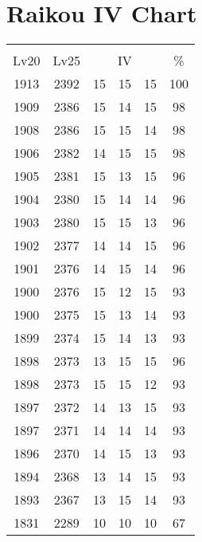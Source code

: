 \documentclass{article}%
\begin{document}
%
\normalsize%
\section{Raikou IV Chart}%
\label{sec:Raikou IV Chart}%
\renewcommand{\arraystretch}{1.5}%
\begin{tabular}{|c|c|c|c|c|c|}%
\hline%
\multicolumn{6}{|c|}{\textcolor{white}{ 
\linebreak{Raikou}
}%
\cellcolor{black}}\\%
\multicolumn{1}{|c}{Lv20}&\multicolumn{1}{c|}{Lv25}&\multicolumn{3}{c|}{IV}&\multicolumn{1}{|c|}{\%}\\%
\hline%
\rowcolor{color100}%
1913&2392&15&15&15&100\\%
\hline%
\rowcolor{color98}%
1909&2386&15&14&15&98\\%
\hline%
\rowcolor{color98}%
1908&2386&15&15&14&98\\%
\hline%
\rowcolor{color98}%
1906&2382&14&15&15&98\\%
\hline%
\rowcolor{color96}%
1905&2381&15&13&15&96\\%
\hline%
\rowcolor{color96}%
1904&2380&15&14&14&96\\%
\hline%
\rowcolor{color96}%
1903&2380&15&15&13&96\\%
\hline%
\rowcolor{color96}%
1902&2377&14&14&15&96\\%
\hline%
\rowcolor{color96}%
1901&2376&14&15&14&96\\%
\hline%
\rowcolor{color93}%
1900&2376&15&12&15&93\\%
\hline%
\rowcolor{color93}%
1900&2375&15&13&14&93\\%
\hline%
\rowcolor{color93}%
1899&2374&15&14&13&93\\%
\hline%
\rowcolor{color96}%
1898&2373&13&15&15&96\\%
\hline%
\rowcolor{color93}%
1898&2373&15&15&12&93\\%
\hline%
\rowcolor{color93}%
1897&2372&14&13&15&93\\%
\hline%
\rowcolor{color93}%
1897&2371&14&14&14&93\\%
\hline%
\rowcolor{color93}%
1896&2370&14&15&13&93\\%
\hline%
\rowcolor{color93}%
1894&2368&13&14&15&93\\%
\hline%
\rowcolor{color93}%
1893&2367&13&15&14&93\\%
\hline%
\rowcolor{color91}%
1831&2289&10&10&10&67\\%
\end{tabular}

%
\end{document}
